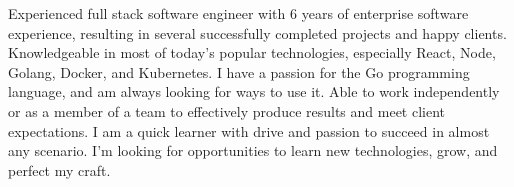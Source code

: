 

\begin{cvparagraph}

Experienced full stack software engineer with 6 years of enterprise software experience, resulting in several successfully completed projects and happy clients. Knowledgeable in most of today's popular technologies, especially React, Node, Golang, Docker, and Kubernetes. I have a passion for the Go programming language, and am always looking for ways to use it. Able to work independently or as a member of a team to effectively produce results and meet client expectations. I am a quick learner with drive and passion to succeed in almost any scenario. I’m looking for opportunities to learn new technologies, grow, and perfect my craft.
\end{cvparagraph}
